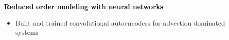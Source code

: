 \documentclass[10pt,letterpaper]{letter}
\newcommand{\gsubsect}[1]{\textcolor{black}{\textbf{{\large #1 }}} }
\begin{document}
\gsubsect{Reduced order modeling with neural networks}
\begin{itemize}
\item {Built and trained convolutional autoencoders for advection dominated systems }

\end{itemize}



\end{document}
